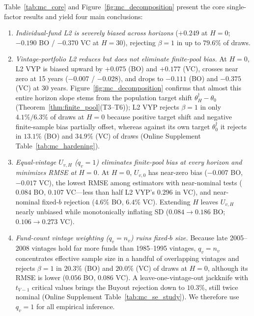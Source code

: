 \documentclass[12pt]{article}
\begin{document}
Table~\ref{tab:mc_core} and Figure~\ref{fig:mc_decomposition} present the core single-factor results and yield four main conclusions:
\begin{enumerate}
  \item \emph{Individual-fund L2 is severely biased across horizons} ($+0.249$ at $H=0$; $-0.190$ BO / $-0.370$ VC at $H=30$), rejecting $\beta=1$ in up to $79.6\%$ of draws.
  \item \emph{Vintage-portfolio L2 reduces but does not eliminate finite-pool bias.} At $H=0$, L2 VYP is biased upward by $+0.075$ (BO) and $+0.177$ (VC), crosses near zero at 15 years ($-0.007$ / $-0.028$), and drops to $-0.111$ (BO) and $-0.375$ (VC) at 30 years. Figure~\ref{fig:mc_decomposition} confirms that almost this entire horizon slope stems from the population target shift $\theta_H^\dagger - \theta_0$ (Theorem~\ref{thm:finite_pool}(T3--T6)); L2 VYP rejects $\beta=1$ in only $4.1\%/6.3\%$ of draws at $H=0$ because positive target shift and negative finite-sample bias partially offset, whereas against its own target $\theta_0^\dagger$ it rejects in $13.1\%$ (BO) and $34.9\%$ (VC) of draws (Online Supplement Table~\ref{tab:mc_hardening}).
  \item \emph{Equal-vintage $U_{v,H}$ ($q_v=1$) eliminates finite-pool bias at every horizon and minimizes RMSE at $H = 0$.} At $H=0$, $U_{v,0}$ has near-zero bias ($-0.007$ BO, $-0.017$ VC), the lowest RMSE among estimators with near-nominal tests ($0.084$ BO, $0.107$ VC---less than half L2 VYP's $0.296$ in VC), and near-nominal fixed-$b$ rejection ($4.6\%$ BO, $6.4\%$ VC). Extending $H$ leaves $U_{v,H}$ nearly unbiased while monotonically inflating SD ($0.084 \to 0.186$ BO; $0.106 \to 0.273$ VC).
  \item \emph{Fund-count vintage weighting ($q_v = n_v$) ruins fixed-$b$ size.} Because late 2005--2008 vintages hold far more funds than 1985--1995 vintages, $q_v = n_v$ concentrates effective sample size in a handful of overlapping vintages and rejects $\beta=1$ in $20.3\%$ (BO) and $20.0\%$ (VC) of draws at $H=0$, although its RMSE is lower ($0.056$ BO, $0.086$ VC). A leave-one-vintage-out jackknife with $t_{V-1}$ critical values brings the Buyout rejection down to $10.3\%$, still twice nominal (Online Supplement Table~\ref{tab:mc_se_study}). We therefore use $q_v = 1$ for all empirical inference.
\end{enumerate}




\end{document}

